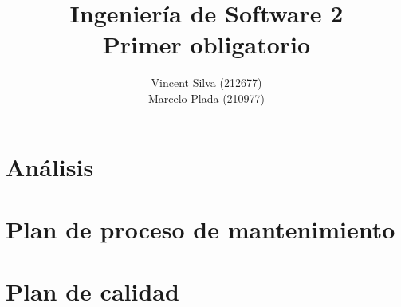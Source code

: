 

%

\title{Ingeniería de Software 2\\Primer obligatorio}
\author{Vincent Silva (212677) \\Marcelo Plada (210977) \\}




\maketitle

\tableofcontents

\chapter{Análisis}





\newpage


\newpage





\newpage
\chapter{Plan de proceso de mantenimiento}
    
    \newpage
    
    \newpage
    
    \newpage
    
    \newpage
    
    \newpage
    
    \newpage
    
    \newpage
        
    \newpage
        
    \newpage
    
    \newpage
    
    \newpage
    
    \newpage
    
    \newpage
\chapter{Plan de calidad}
    
    \newpage
    
    

